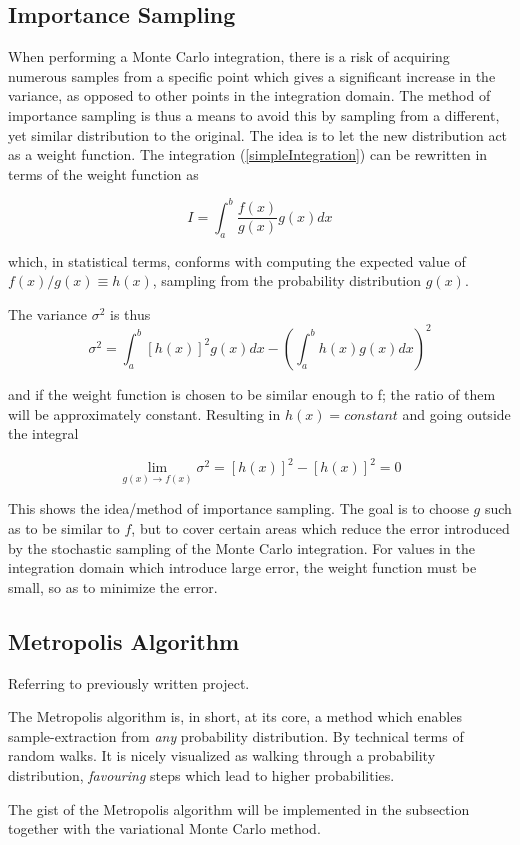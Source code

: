 \documentclass[aip,nobalancelastpage,
twocolumn,
rsi,%
 amsmath,amssymb,
 reprint,%
]{revtex4}
\begin{document}
\subsection{Importance Sampling}

When performing a Monte Carlo integration, there is a risk of acquiring numerous samples from a specific point which gives a significant increase in the variance, as opposed to other points in the integration domain. The method of importance sampling is thus a means to avoid this by sampling from a different, yet similar distribution to the original. The idea is to let the new distribution act as a weight function. The integration (\ref{simpleIntegration}) can be rewritten in terms of the weight function as 

\begin{equation}
I = \int_a^b \frac{f(x)}{g(x)} g(x) dx
\end{equation}

which, in statistical terms, conforms with computing the expected value of $f(x)/g(x) \equiv h(x)$, sampling from the probability distribution $g(x)$. \par
The variance $\sigma^2$ is thus
\begin{equation}
\sigma^2 = \int_a^b \left[h(x)\right]^2 g(x) dx - \left(\int_a^b h(x) g(x) dx\right)^2
\end{equation}

and if the weight function is chosen to be similar enough to f; the ratio of them will be approximately constant. Resulting in $h(x)=constant$ and going outside the integral

\begin{equation}
\lim_{ g(x) \to f(x)}  \sigma^2 = \left[h(x)\right]^2 -\left[h(x)\right]^2 = 0
\end{equation}

This shows the idea/method of importance sampling. The goal is to choose $g$ such as to be similar to $f$, but to cover certain areas which reduce the error introduced by the stochastic sampling of the Monte Carlo integration. For values in the integration domain which introduce large error, the weight function must be small, so as to minimize the error. 

\subsection{Metropolis Algorithm}
Referring to previously written project\cite{Project4}.\par 
The Metropolis algorithm is, in short, at its core, a method which enables sample-extraction from \textit{any} probability distribution. By technical terms of random walks. It is nicely visualized as walking through a probability distribution, \textit{favouring} steps which lead to higher probabilities.\par
The gist of the Metropolis algorithm will be implemented in the subsection together with the variational Monte Carlo method.
\end{document}
